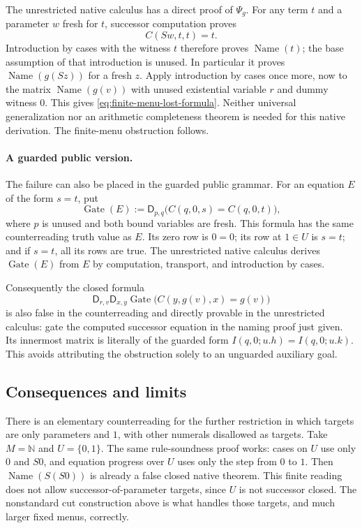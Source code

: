 The unrestricted native calculus has a direct proof of $\Psi_g$.
For any term $t$ and a parameter $w$ fresh for $t$, successor computation
proves
\[
 C(Sw,t,t)=t.
\]
Introduction by cases with the witness $t$ therefore proves
$\operatorname{Name}(t)$; the base assumption of that introduction is
unused.  In particular it proves $\operatorname{Name}(g(Sz))$ for a fresh
$z$.  Apply introduction by cases once more, now to the matrix
$\operatorname{Name}(g(v))$ with unused existential variable $r$ and
dummy witness $0$.  This gives \eqref{eq:finite-menu-lost-formula}.
Neither universal generalization nor an arithmetic completeness theorem is
needed for this native derivation.  The finite-menu obstruction follows.

\paragraph{A guarded public version.}
The failure can also be placed in the guarded public grammar.  For an
equation $E$ of the form $s=t$, put
\[
 \operatorname{Gate}(E)
  :=\mathsf D_{p,q}\bigl(C(q,0,s)=C(q,0,t)\bigr),
\]
where $p$ is unused and both bound variables are fresh.  This formula has
the same counterreading truth value as $E$.  Its zero row is $0=0$; its
row at $1\in U$ is $s=t$; and if $s=t$, all its rows are true.  The
unrestricted native calculus derives $\operatorname{Gate}(E)$ from $E$
by computation, transport, and introduction by cases.

Consequently the closed formula
\[
 \mathsf D_{r,v}\mathsf D_{x,y}
 \operatorname{Gate}\bigl(C(y,g(v),x)=g(v)\bigr)
\]
is also false in the counterreading and directly provable in the
unrestricted calculus: gate the computed successor equation in the naming
proof just given.  Its innermost matrix is literally of the guarded form
$I(q,0;u.h)=I(q,0;u.k)$.  This avoids attributing the obstruction solely to
an unguarded auxiliary goal.

\subsection{Consequences and limits}

There is an elementary counterreading for the further restriction in which
targets are only parameters and $1$, with other numerals disallowed as
targets.
Take $M=\mathbb N$ and $U=\{0,1\}$.  The same rule-soundness proof works:
cases on $U$ use only $0$ and $S0$, and equation progress over $U$ uses
only the step from $0$ to $1$.  Then
$\operatorname{Name}(S(S0))$ is already a false closed native theorem.
This finite reading does not allow successor-of-parameter targets, since
$U$ is not successor closed.  The nonstandard cut construction above is
what handles those targets, and much larger fixed menus, correctly.


